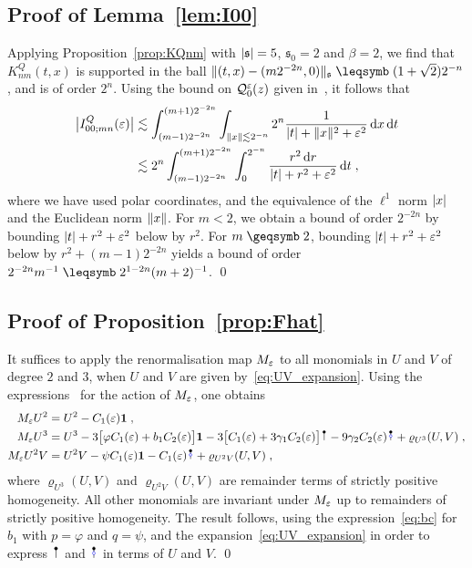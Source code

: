 \documentclass[reqno,11pt]{article}
\def\unit{\vone}
\def\fraks{\mathfrak{s}}
\begin{document}

\subsection{Proof of Lemma~\ref{lem:I00}}
\label{app:renorm1} 

Applying Proposition~\ref{prop:KQnm} with $\abs{\fraks}=5$, $\fraks_0=2$ and 
$\beta=2$, we find that $K^Q_{nm}(t,x)$ is supported in the ball  
$\norm{(t,x)-(m2^{-2n},0)}_\fraks \leqs (1+\sqrt{2})2^{-n}$, and is of order 
$2^n$. Using the bound on ${\mathcal Q}^\varepsilon_0(z)$ given in~\cite[Lem.~6.2]{BK2016}, it 
follows that 
\begin{align}
 \bigl|I^Q_{00;mn}(\varepsilon)\bigr| 
& \lesssim \int_{(m-1)2^{-2n}}^{(m+1)2^{-2n}} 
\int_{\lVert x\rVert\lesssim 2^{-n}} 2^n\frac{1}{\lvert t\rvert+\lVert x\rVert^2+\varepsilon^2} \operatorname{d}\!x \operatorname{d}\!t \\
& \lesssim 2^n \int_{(m-1)2^{-2n}}^{(m+1)2^{-2n}} 
\int_0^{2^{-n}}\frac{r^2\operatorname{d}\!r}{\lvert t\rvert+r^2+\varepsilon^2} \operatorname{d}\!t\;,
\end{align} 
where we have used polar coordinates, and the equivalence of the $\ell^1$ norm 
$\lvert x\rvert$ and the Euclidean norm $\lVert x\rVert$. For $m<2$, we 
obtain a bound of order $2^{-2n}$ by bounding $\lvert t\rvert+r^2+\varepsilon^2$ below by 
$r^2$. For $m\geqs2$, bounding $\lvert t\rvert+r^2+\varepsilon^2$ below by 
$r^2 + (m-1)2^{-2n}$ yields a bound of order $2^{-2n}m^{-1} \leqs 
2^{1-2n}(m+2)^{-1}$. 
\qed


\subsection{Proof of Proposition~\ref{prop:Fhat}}
\label{app:renorm2} 

It suffices to apply the renormalisation map $M_\varepsilon$ to all monomials in $U$ 
and $V$ of degree $2$ and $3$, when $U$ and $V$ are given 
by~\eqref{eq:UV_expansion}. Using the expressions~\cite[(6.12)]{BK2016} for the 
action of $M_\varepsilon$, one obtains 
\begin{align}
\nonumber
M_\eps U^2 &= U^2 - C_1(\eps)\unit\;, \\
\nonumber
M_\eps U^3 &= U^3 - 3\bigbrak{\varphi C_1(\eps) + b_1 
C_2(\eps)}\unit - 3\bigbrak{C_1(\eps)+3\gamma_1 C_2(\eps)} \RSI
- 9\gamma_2 C_2(\eps) \RSoI 
+ \varrho_{U^3}(U,V)\;, \\
M_\eps U^2 V &= U^2 V - \psi C_1(\eps) \unit - C_1(\eps) \RSoI 
+ \varrho_{U^2V}(U,V)\;, 
\end{align}
where $\varrho_{U^3}(U,V)$ and $\varrho_{U^2V}(U,V)$ are remainder terms of 
strictly positive homogeneity. All other monomials are invariant under $M_\varepsilon$ 
up to remainders of strictly positive homogeneity. The result follows, using 
the expression~\eqref{eq:bc} for $b_1$ with $p=\varphi$ and $q=\psi$, and 
the expansion~\eqref{eq:UV_expansion} in order to express $\RSI$ and $\RSoI$ in 
terms of $U$ and $V$.
\qed
\end{document}
